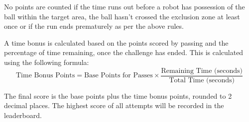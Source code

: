 No points are counted if the time runs out before a robot has possession of the ball
within the target area, the ball hasn't crossed the exclusion zone at least once
or if the run ends prematurely as per the above rules.

A time bonus is calculated based on the points scored by passing and the percentage of time remaining, once the
challenge has ended. This is calculated using the following formula:
\[
\text{Time Bonus Points} = \text{Base Points for Passes} \times \frac{\text{Remaining Time (seconds)}}{\text{Total Time (seconds)}}
\]

The final score is the base points plus the time bonus points, rounded to 2 decimal places. The highest score of all attempts will be recorded in the leaderboard.
